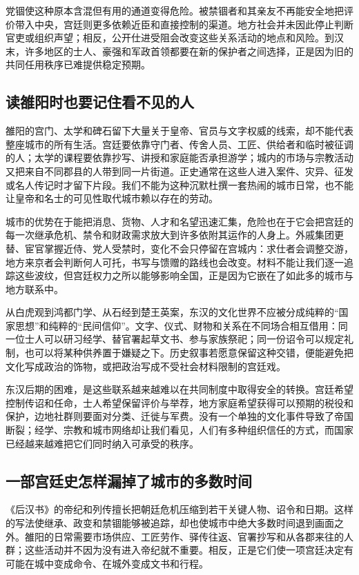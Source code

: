 党锢使这种原本含混但有用的通道变得危险。被禁锢者和其亲友不再能安全地把评价带入中央，宫廷则更多依赖近臣和直接控制的渠道。地方社会并未因此停止判断官吏或组织声望；相反，公开仕进受阻会改变这些关系活动的地点和风险。到汉末，许多地区的士人、豪强和军政首领都要在新的保护者之间选择，正是因为旧的共同任用秩序已难提供稳定预期。

\subsection{读雒阳时也要记住看不见的人}

雒阳的宫门、太学和碑石留下大量关于皇帝、官员与文字权威的线索，却不能代表整座城市的所有生活。宫廷要依靠守门者、传舍人员、工匠、供给者和临时被征调的人；太学的课程要依靠抄写、讲授和家庭能否承担游学；城内的市场与宗教活动又把来自不同郡县的人带到同一片街道。正史通常在这些人进入案件、灾异、征发或名人传记时才留下片段。我们不能为这种沉默杜撰一套热闹的城市日常，也不能让皇帝和名士的可见性取代城市赖以存在的劳动。

城市的优势在于能把消息、货物、人才和名望迅速汇集，危险也在于它会把宫廷的每一次继承危机、禁令和财政需求放大到许多依附其运作的人身上。外戚集团更替、宦官掌握近侍、党人受禁时，变化不会只停留在宫城内：求仕者会调整交游，地方来京者会判断何人可托，书写与馈赠的路线也会改变。材料不能让我们逐一追踪这些波纹，但宫廷权力之所以能够影响全国，正是因为它嵌在了如此多的城市与地方联系中。

从白虎观到鸿都门学、从石经到楚王英案，东汉的文化世界不应被分成纯粹的“国家思想”和纯粹的“民间信仰”。文字、仪式、财物和关系在不同场合相互借用：同一位士人可以研习经学、替官署起草文书、参与家族祭祀；同一份诏令可以规定礼制，也可以将某种供养置于嫌疑之下。历史叙事若愿意保留这种交错，便能避免把文化写成政治的饰物，或把政治写成不受社会材料限制的宫廷戏。

东汉后期的困难，是这些联系越来越难以在共同制度中取得安全的转换。宫廷希望控制传诏和任命，士人希望保留评价与举荐，地方家庭希望获得可以预期的税役和保护，边地社群则要面对分类、迁徙与军费。没有一个单独的文化事件导致了帝国断裂；经学、宗教和城市网络却让我们看见，人们有多种组织信任的方式，而国家已经越来越难把它们同时纳入可承受的秩序。

\subsection{一部宫廷史怎样漏掉了城市的多数时间}

《后汉书》的帝纪和列传擅长把朝廷危机压缩到若干关键人物、诏令和日期。这样的写法使继承、政变和禁锢能够被追踪，却也使城市中绝大多数时间退到画面之外。雒阳的日常需要市场供应、工匠劳作、驿传往返、官署抄写和从各郡来往的人群；这些活动并不因为没有进入帝纪就不重要。相反，正是它们使一项宫廷决定有可能在城中变成命令、在城外变成文书和行程。

